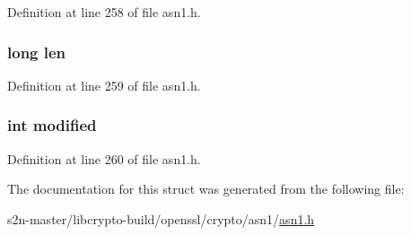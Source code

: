 Definition at line 258 of file asn1.\+h.

\subsubsection[{\texorpdfstring{len}{len}}]{\setlength{\rightskip}{0pt plus 5cm}long len}\hypertarget{struct_a_s_n1___e_n_c_o_d_i_n_g__st_aaccba9d5adc3f6c39aad767db95ba484}{}\label{struct_a_s_n1___e_n_c_o_d_i_n_g__st_aaccba9d5adc3f6c39aad767db95ba484}


Definition at line 259 of file asn1.\+h.

\subsubsection[{\texorpdfstring{modified}{modified}}]{\setlength{\rightskip}{0pt plus 5cm}int modified}\hypertarget{struct_a_s_n1___e_n_c_o_d_i_n_g__st_a0826efcc81bba9d934e1207721a46ddf}{}\label{struct_a_s_n1___e_n_c_o_d_i_n_g__st_a0826efcc81bba9d934e1207721a46ddf}


Definition at line 260 of file asn1.\+h.



The documentation for this struct was generated from the following file\+:\begin{DoxyCompactItemize}
\item 
s2n-\/master/libcrypto-\/build/openssl/crypto/asn1/\hyperlink{crypto_2asn1_2asn1_8h}{asn1.\+h}\end{DoxyCompactItemize}
